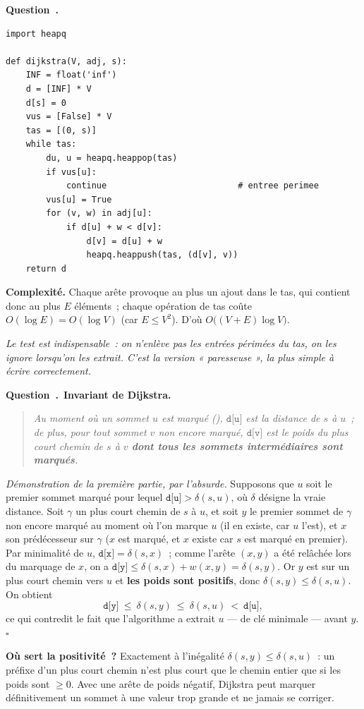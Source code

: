 \documentclass[11pt,a4paper]{article}
\renewcommand{\Q}{\medskip\par\stepcounter{qcnt}\noindent\textbf{\color{cnc}Question~\theqcnt.}~}
\begin{document}
\Q
\begin{lstlisting}
import heapq

def dijkstra(V, adj, s):
    INF = float('inf')
    d = [INF] * V
    d[s] = 0
    vus = [False] * V
    tas = [(0, s)]
    while tas:
        du, u = heapq.heappop(tas)
        if vus[u]:
            continue                          # entree perimee
        vus[u] = True
        for (v, w) in adj[u]:
            if d[u] + w < d[v]:
                d[v] = d[u] + w
                heapq.heappush(tas, (d[v], v))
    return d
\end{lstlisting}
\textbf{Complexité.} Chaque arête provoque au plus un ajout dans le tas, qui contient donc au
plus $E$ éléments~; chaque opération de tas coûte $O(\log E)=O(\log V)$ (car $E\le V^2$).
D'où $\boxed{O\big((V+E)\log V\big)}$.

\emph{Le test  est indispensable~: on n'enlève pas les entrées
périmées du tas, on les ignore lorsqu'on les extrait. C'est la version « paresseuse »,
la plus simple à écrire correctement.}

\Q \textbf{Invariant de Dijkstra.}
\begin{quote}\itshape
Au moment où un sommet $u$ est marqué (), $\texttt{d[u]}$ est la distance
de $s$ à $u$~; de plus, pour tout sommet $v$ non encore marqué, $\texttt{d[v]}$ est le poids du
plus court chemin de $s$ à $v$ \textbf{dont tous les sommets intermédiaires sont marqués}.
\end{quote}
\emph{Démonstration de la première partie, par l'absurde.} Supposons que $u$ soit le premier
sommet marqué pour lequel $\texttt{d[u]}>\delta(s,u)$, où $\delta$ désigne la vraie distance.
Soit $\gamma$ un plus court chemin de $s$ à $u$, et soit $y$ le premier sommet de $\gamma$
non encore marqué au moment où l'on marque $u$ (il en existe, car $u$ l'est), et $x$ son
prédécesseur sur $\gamma$ ($x$ est marqué, et $x$ existe car $s$ est marqué en premier). Par
minimalité de $u$, $\texttt{d[x]}=\delta(s,x)$~; comme l'arête $(x,y)$ a été relâchée lors du
marquage de $x$, on a $\texttt{d[y]}\le\delta(s,x)+w(x,y)=\delta(s,y)$. Or $y$ est sur un plus
court chemin vers $u$ et \textbf{les poids sont positifs}, donc
$\delta(s,y)\le\delta(s,u)$. On obtient
\[ \texttt{d[y]}\ \le\ \delta(s,y)\ \le\ \delta(s,u)\ <\ \texttt{d[u]}, \]
ce qui contredit le fait que l'algorithme a extrait $u$ — de clé minimale — avant $y$.
\hfill$\square$

\textbf{Où sert la positivité~?} Exactement à l'inégalité $\delta(s,y)\le\delta(s,u)$~: un
préfixe d'un plus court chemin n'est plus court que le chemin entier que si les poids sont
$\ge 0$. Avec une arête de poids négatif, Dijkstra peut marquer définitivement un sommet à
une valeur trop grande et ne jamais se corriger.
\end{document}
